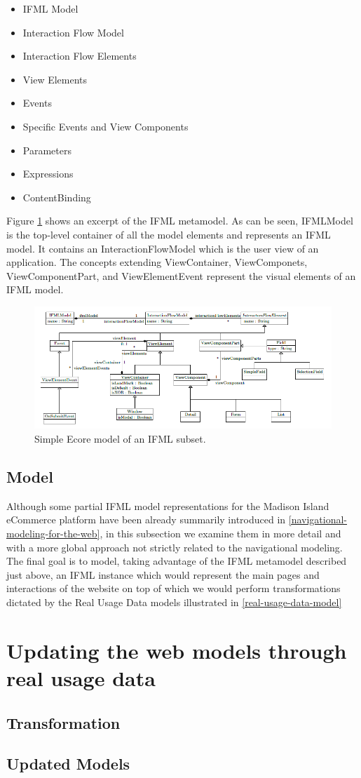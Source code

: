\begin{itemize}
  \item IFML Model
  \item Interaction Flow Model
  \item Interaction Flow Elements
  \item View Elements
  \item Events
  \item Specific Events and View Components
  \item Parameters
  \item Expressions
  \item ContentBinding
\end{itemize}

Figure \ref{fig:simple-ifml-core-model} shows an excerpt of the IFML metamodel. As can be seen, IFMLModel is the top-level container of all the model elements and represents an IFML model. It contains an InteractionFlowModel which is the user view of an application. The concepts extending ViewContainer, ViewComponets, ViewComponentPart, and ViewElementEvent represent the visual elements of an IFML model.

\vspace{0.5cm}
\begin{figure}[H]
  \centering
    \includegraphics[width=12cm]{images/diagrams/ifml-metamodel.png}
  \caption{Simple Ecore model of an IFML subset.}
  \label{fig:simple-ifml-core-model}
\end{figure}
\vspace{0.5cm}

\subsection{Model}

Although some partial IFML model representations for the Madison Island eCommerce platform have been already summarily introduced in \ref{navigational-modeling-for-the-web}, in this subsection we examine them in more detail and with a more global approach not strictly related to the navigational modeling. The final goal is to model, taking advantage of the IFML metamodel described just above, an IFML instance which would represent the main pages and interactions of the website on top of which we would perform transformations dictated by the Real Usage Data models illustrated in \ref{real-usage-data-model}

\section{Updating the web models through real usage data}

\subsection{Transformation}

\subsection{Updated Models}
